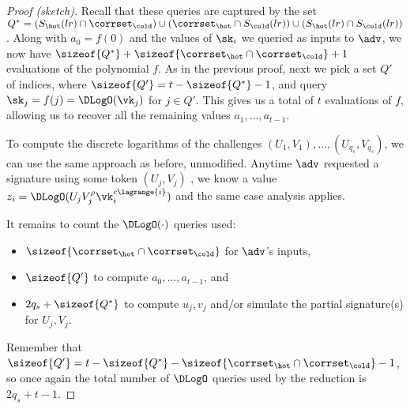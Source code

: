 \begin{proof}[Proof (sketch)]
Recall that these queries are captured by the set $Q^* = (S_\hot(lr) \cap \corrset_\cold) \cup (\corrset_\hot \cap S_\cold(lr)) \cup (S_\hot(lr) \cap S_\cold(lr))$. Along with $a_0 = f(0)$ and the values of $\sk_i$ we queried as inputs to $\adv$, we now have $\sizeof{Q^*} + \sizeof{\corrset_\hot \cap \corrset_\cold} + 1$ evaluations of the polynomial $f$. As in the previous proof, next we pick a set $Q'$ of indices, where $\sizeof{Q'} = t - \sizeof{Q^*} - 1$, and query $\sk_j = f(j) = \DLogO(\vk_j)$ for $j \in Q'$. This gives us a total of $t$ evaluations of $f$, allowing us to recover all the remaining values $a_1, \dots, a_{t-1}$.

To compute the discrete logarithms of the challenges $(U_1, V_1), \dots, (U_{q_s}, V_{q_s})$, we can use the same approach as before, unmodified. Anytime $\adv$ requested a signature using some token $(U_j, V_j)$ , we know a value $z_i = \DLogO(U_j V_j^\rho \vk_i^{c \lagrange{i}})$ and the same case analysis applies.

It remains to count the $\DLogO(\cdot)$ queries used: 
\begin{itemize}
    \item $\sizeof{\corrset_\hot \cap \corrset_\cold}$ for $\adv$'s inputs, 
    \item $\sizeof{Q'}$ to compute $a_0, \dots, a_{t-1}$, and
    \item $2 q_s + \sizeof{Q^*}$ to compute $u_j, v_j$ and/or simulate the partial signature(s) for $U_j, V_j$.
\end{itemize}
Remember that $\sizeof{Q'} = t - \sizeof{Q^*} - \sizeof{\corrset_\hot \cap \corrset_\cold} - 1$, so once again the total number of $\DLogO$ queries used by the reduction is $2q_s + t - 1$.


\end{proof}